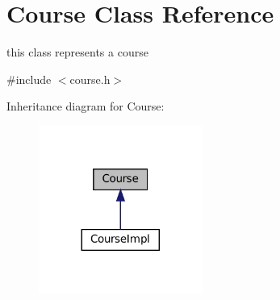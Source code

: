 \hypertarget{classCourse}{}\section{Course Class Reference}
\label{classCourse}


this class represents a course  




{\ttfamily \#include $<$course.\+h$>$}



Inheritance diagram for Course\+:\nopagebreak
\begin{figure}[H]
\begin{center}
\leavevmode
\includegraphics[width=152pt]{classCourse__inherit__graph}
\end{center}
\end{figure}
